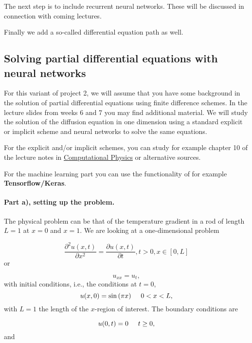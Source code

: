 \documentclass[%
oneside,                 %
final,                   %
10pt]{article}
\begin{document}
The next step is to include recurrent neural networks. These will be discussed in connection with coming lectures.

Finally we add a so-called differential equation path as well.

\subsection*{Solving partial differential equations with neural networks}

For this variant of project 2, we will assume that you have some
background in the solution of partial differential equations using
finite difference schemes. In the lecture slides from weeks 6 and 7 you may find additional material.
We will study the solution of the diffusion
equation in one dimension using a standard explicit or implicit scheme and neural
networks to solve the same equations.

For the explicit and/or implicit schemes, you can study for example chapter 10 of the lecture notes in \href{{https://github.com/CompPhysics/ComputationalPhysics/blob/master/doc/Lectures/lectures2015.pdf}}{Computational Physics} or alternative sources. 

For the machine learning part you can use the functionality of for example \textbf{Tensorflow/Keras}.

\paragraph{Part a), setting up the problem.}
The physical problem can be that of the temperature gradient in a rod of length $L=1$ at $x=0$ and $x=1$.
We are looking at a one-dimensional
problem

\begin{equation*}
 \frac{\partial^2 u(x,t)}{\partial x^2} =\frac{\partial u(x,t)}{\partial t}, t> 0, x\in [0,L]
\end{equation*}
or

\begin{equation*}
u_{xx} = u_t,
\end{equation*}
with initial conditions, i.e., the conditions at $t=0$,
\begin{equation*}
u(x,0)= \sin{(\pi x)} \hspace{0.5cm} 0 < x < L,
\end{equation*}
with $L=1$ the length of the $x$-region of interest. The 
boundary conditions are

\begin{equation*}
u(0,t)= 0 \hspace{0.5cm} t \ge 0,
\end{equation*}
and
\end{document}
